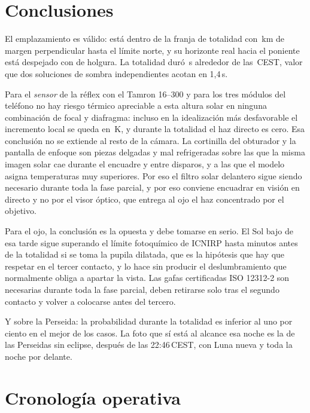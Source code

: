 \documentclass[10pt,a4paper]{article}
\begin{document}
\section{Conclusiones}

El emplazamiento es válido: está dentro de la franja de totalidad con
\perpLimit\,km de margen perpendicular hasta el límite norte, y su horizonte real hacia el
poniente está despejado con \clearance\textdegree{} de holgura. La totalidad
duró \totalityDur\,s alrededor de las \localMax\,CEST, valor que dos soluciones
de sombra independientes acotan en 1,4\,s.

Para el \emph{sensor} de la réflex con el Tamron 16--300 y para los tres módulos
del teléfono no hay riesgo térmico apreciable a esta altura solar en ninguna
combinación de focal y diafragma: incluso en la idealización más desfavorable el
incremento local se queda en \dTworstThreeZeroZero\,K, y durante la totalidad el
haz directo es cero. Esa conclusión no se extiende al resto de la cámara. La
cortinilla del obturador y la pantalla de enfoque son piezas delgadas y mal
refrigeradas sobre las que la misma imagen solar cae durante el encuadre y entre
disparos, y a las que el modelo asigna temperaturas muy superiores. Por eso
el filtro solar delantero sigue siendo necesario durante toda la fase parcial, y
por eso conviene encuadrar en visión en directo y no por el visor óptico, que
entrega al ojo el haz concentrado por el objetivo.

Para el ojo, la conclusión es la opuesta y debe tomarse en serio. El Sol bajo de
esa tarde sigue superando el límite fotoquímico de ICNIRP hasta
\unlimitedFromPSeven{} minutos antes de la totalidad si se toma la pupila
dilatada, que es la hipótesis que hay que respetar en el tercer contacto, y lo hace sin producir el deslumbramiento que
normalmente obliga a apartar la vista. Las gafas certificadas ISO 12312-2 son
necesarias durante toda la fase parcial, deben retirarse solo tras el segundo
contacto y volver a colocarse antes del tercero.

Y sobre la Perseida: la probabilidad durante la totalidad es inferior al uno por
ciento en el mejor de los casos. La foto que sí está al alcance esa noche es la
de las Perseidas sin eclipse, después de las 22:46\,CEST, con Luna nueva y toda
la noche por delante.

\appendix

\section{Cronología operativa}
\end{document}
